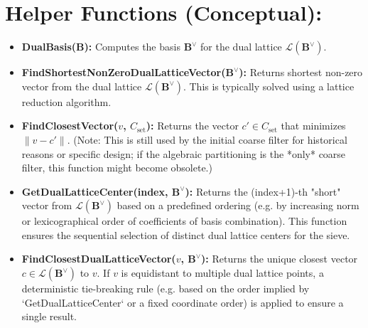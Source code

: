 \documentclass{article}
\begin{document}
\vspace{1em} %
\section{Helper Functions (Conceptual):}
\begin{itemize}
    \item \textbf{DualBasis($\mathbf{B}$):} Computes the basis $\mathbf{B}^{\vee}$ for the dual lattice $\mathcal{L}(\mathbf{B}^{\vee})$.
    \item \textbf{FindShortestNonZeroDualLatticeVector($\mathbf{B}^{\vee}$):} Returns  shortest non-zero vector from the dual lattice $\mathcal{L}(\mathbf{B}^{\vee})$. This is typically solved using a lattice reduction algorithm.
    \item \textbf{FindClosestVector($v$, $C_{\text{set}}$):} Returns the vector $c' \in C_{\text{set}}$ that minimizes $\|v - c'\|$. (Note: This is still used by the initial coarse filter for historical reasons or specific design; if the algebraic partitioning is the *only* coarse filter, this function might become obsolete.)
    \item \textbf{GetDualLatticeCenter(index, $\mathbf{B}^{\vee}$):} Returns the (index+1)-th "short" vector from $\mathcal{L}(\mathbf{B}^{\vee})$ based on a predefined ordering (e.g. by increasing norm or lexicographical order of coefficients of basis combination). This function ensures the sequential selection of distinct dual lattice centers for the sieve.
    \item \textbf{FindClosestDualLatticeVector($v$, $\mathbf{B}^{\vee}$):} Returns the unique closest vector $c \in \mathcal{L}(\mathbf{B}^{\vee})$ to $v$. If $v$ is equidistant to multiple dual lattice points, a deterministic tie-breaking rule (e.g. based on the order implied by `GetDualLatticeCenter` or a fixed coordinate order) is applied to ensure a single result.
\end{itemize}
\end{document}

